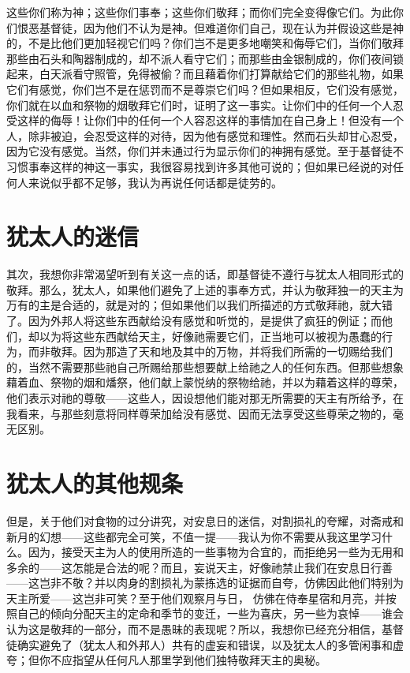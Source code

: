 这些你们称为神；这些你们事奉；这些你们敬拜；而你们完全变得像它们。为此你们恨恶基督徒，因为他们不认为是神。但难道你们自己，现在认为并假设这些是神的，不是比他们更加轻视它们吗？你们岂不是更多地嘲笑和侮辱它们，当你们敬拜那些由石头和陶器制成的，却不派人看守它们；而那些由金银制成的，你们夜间锁起来，白天派看守照管，免得被偷？而且藉着你们打算献给它们的那些礼物，如果它们有感觉，你们岂不是在惩罚而不是尊崇它们吗？但如果相反，它们没有感觉，你们就在以血和祭物的烟敬拜它们时，证明了这一事实。让你们中的任何一个人忍受这样的侮辱！让你们中的任何一个人容忍这样的事情加在自己身上！但没有一个人，除非被迫，会忍受这样的对待，因为他有感觉和理性。然而石头却甘心忍受，因为它没有感觉。当然，你们并未通过行为显示你们的神拥有感觉。至于基督徒不习惯事奉这样的神这一事实，我很容易找到许多其他可说的；但如果已经说的对任何人来说似乎都不足够，我认为再说任何话都是徒劳的。\par


\section{犹太人的迷信}

其次，我想你非常渴望听到有关这一点的话，即基督徒不遵行与犹太人相同形式的敬拜。那么，犹太人，如果他们避免了上述的事奉方式，并认为敬拜独一的天主为万有的主是合适的，就是对的；但如果他们以我们所描述的方式敬拜祂，就大错了。因为外邦人将这些东西献给没有感觉和听觉的，是提供了疯狂的例证；而他们，却以为将这些东西献给天主，好像祂需要它们，正当地可以被视为愚蠢的行为，而非敬拜。因为那造了天和地及其中的万物，并将我们所需的一切赐给我们的，当然不需要那些祂自己所赐给那些想要献上给祂之人的任何东西。但那些想象藉着血、祭物的烟和燔祭，他们献上蒙悦纳的祭物给祂，并以为藉着这样的尊荣，他们表示对祂的尊敬——这些人，因设想他们能对那无所需要的天主有所给予，在我看来，与那些刻意将同样尊荣加给没有感觉、因而无法享受这些尊荣之物的，毫无区别。\par


\section{犹太人的其他规条}

但是，关于他们对食物的过分讲究，对安息日的迷信，对割损礼的夸耀，对斋戒和新月的幻想——这些都完全可笑，不值一提——我认为你不需要从我这里学习什么。因为，接受天主为人的使用所造的一些事物为合宜的，而拒绝另一些为无用和多余的——这怎能是合法的呢？而且，妄说天主，好像祂禁止我们在安息日行善——这岂非不敬？并以肉身的割损礼为蒙拣选的证据而自夸，仿佛因此他们特别为天主所爱——这岂非可笑？至于他们观察月与日， 仿佛在侍奉星宿和月亮，并按照自己的倾向分配天主的定命和季节的变迁，一些为喜庆，另一些为哀悼——谁会认为这是敬拜的一部分，而不是愚昧的表现呢？所以，我想你已经充分相信，基督徒确实避免了（犹太人和外邦人）共有的虚妄和错误，以及犹太人的多管闲事和虚夸；但你不应指望从任何凡人那里学到他们独特敬拜天主的奥秘。\par

